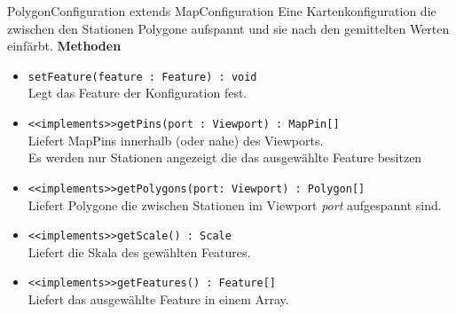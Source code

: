     \begin{Class}{PolygonConfiguration extends MapConfiguration}
        Eine Kartenkonfiguration die zwischen den Stationen Polygone aufspannt und sie nach den gemittelten Werten einfärbt.
        \textbf{Methoden}
        \begin{itemize}
            \item \texttt{setFeature(feature : Feature) : void}
            \\ Legt das Feature der Konfiguration fest.
            \item \texttt{<<implements>>getPins(port : Viewport) : MapPin[]}
            \\ Liefert MapPins innerhalb (oder nahe) des Viewports.
            \\ Es werden nur Stationen angezeigt die das ausgewählte Feature besitzen
            \item \texttt{<<implements>>getPolygons(port: Viewport) : Polygon[]}
            \\ Liefert Polygone die zwischen Stationen im Viewport \emph{port} aufgespannt sind.
            \item \texttt{<<implements>>getScale() : Scale}
            \\ Liefert die Skala des gewählten Features.
            \item \texttt{<<implements>>getFeatures() : Feature[]}
            \\ Liefert das ausgewählte Feature in einem Array.
        \end{itemize}
    \end{Class}

